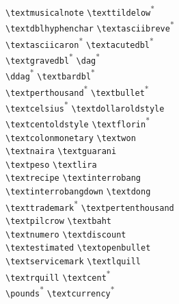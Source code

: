 {\begin{tabbing}
\textmusicalnote \> \verb+\textmusicalnote+ \> \texttildelow \> \verb+\texttildelow+\textsuperscript{*} \\
\textdblhyphenchar \> \verb+\textdblhyphenchar+ \> \textasciibreve \> \verb+\textasciibreve+\textsuperscript{*} \\
\textasciicaron \> \verb+\textasciicaron+\textsuperscript{*}  \> \textacutedbl \> \verb+\textacutedbl+\textsuperscript{*} \\
\textgravedbl \> \verb+\textgravedbl+\textsuperscript{*}  \> \textdagger \> \verb+\dag+\textsuperscript{*} \\
\textdaggerdbl \> \verb+\ddag+\textsuperscript{*} \> \textbardbl \> \verb+\textbardbl+\textsuperscript{*} \\
\textperthousand \> \verb+\textperthousand+\textsuperscript{*} \> \textbullet \> \verb+\textbullet+\textsuperscript{*} \\
\textcelsius \> \verb+\textcelsius+\textsuperscript{*}  \> \textdollaroldstyle \> \verb+\textdollaroldstyle+\\
\textcentoldstyle \> \verb+\textcentoldstyle+ \> \textflorin \> \verb+\textflorin+\textsuperscript{*} \\
\textcolonmonetary \> \verb+\textcolonmonetary+ \> \textwon \> \verb+\textwon+\\
\textnaira \> \verb+\textnaira+ \> \textguarani \> \verb+\textguarani+\\
\textpeso \> \verb+\textpeso+ \> \textlira \> \verb+\textlira+\\
\textrecipe \> \verb+\textrecipe+ \> \textinterrobang \> \verb+\textinterrobang+\\
\textinterrobangdown \> \verb+\textinterrobangdown+ \> \textdong \> \verb+\textdong+\\
\texttrademark \> \verb+\texttrademark+\textsuperscript{*} \> \textpertenthousand \> \verb+\textpertenthousand+\\
\textpilcrow \> \verb+\textpilcrow+ \> \textbaht \> \verb+\textbaht+\\
\textnumero \> \verb+\textnumero+ \> \textdiscount \> \verb+\textdiscount+\\
\textestimated \> \verb+\textestimated+ \> \textopenbullet \> \verb+\textopenbullet+\\
\textservicemark \> \verb+\textservicemark+ \> \textlquill \> \verb+\textlquill+\\
\textrquill \> \verb+\textrquill+ \> \textcent \> \verb+\textcent+\textsuperscript{*} \\
\textsterling \> \verb+\pounds+\textsuperscript{*}  \> \textcurrency \> \verb+\textcurrency+\textsuperscript{*} \\

\end{tabbing}}
